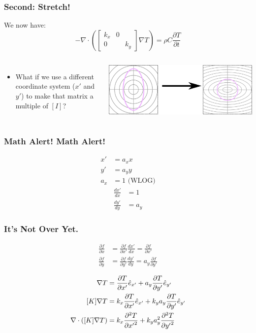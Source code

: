 \documentclass{beamer}
\begin{document}
\begin{frame}
\frametitle{Second: Stretch!}
We now have:
\begin{equation*}
-\nabla \cdot \left(\begin{bmatrix}k_x & 0\\ 0 && k_y\end{bmatrix}\nabla T \right)= \rho C\frac{\partial T}{\partial t}
\end{equation*}

\begin{columns}
    \begin{itemize}
    \item What if we use a different coordinate system (\(x'\) and \(y'\)) to make
    that matrix a multiple of \([I]\)?
    \end{itemize}
    \includegraphics[width=\textwidth]{fig/coordinate_transformation.png}
\end{columns}
\end{frame}

\begin{frame}
\frametitle{Math Alert! Math Alert!}

\begin{align*}
x' &= a_x x\\
y' &= a_y y\\
a_x &= 1 \textrm{ (WLOG)}
\end{align*}
\begin{align*}
\frac{dx'}{dx} &= 1\\
\frac{dy'}{dy} &= a_y
\end{align*}
\end{frame}


\begin{frame}
\frametitle{It's Not Over Yet.}
\begin{align*}
\frac{\partial f}{\partial x} &= \frac{\partial f}{\partial x'}\frac{dx'}{dx} = \frac{\partial f}{\partial x'}\\
\frac{\partial f}{\partial y} &= \frac{\partial f}{\partial y'}\frac{dy'}{dy} = a_y\frac{\partial f}{\partial y'}
\end{align*}

\begin{align*}
\nabla T &= \frac{\partial T}{\partial x'} \hat{e}_{x'} + a_y\frac{\partial T}{\partial y'} \hat{e}_{y'} \\
[K]\nabla T &= k_x\frac{\partial T}{\partial x'} \hat{e}_{x'} + k_ya_y\frac{\partial T}{\partial y'} \hat{e}_{y'}\\
\nabla \cdot \left([K]\nabla T\right) &= k_x\frac{\partial^2 T}{\partial {x'}^2} + k_ya_y^2\frac{\partial^2 T}{\partial {y'}^2}\\
\end{align*}
\end{frame}
\end{document}
